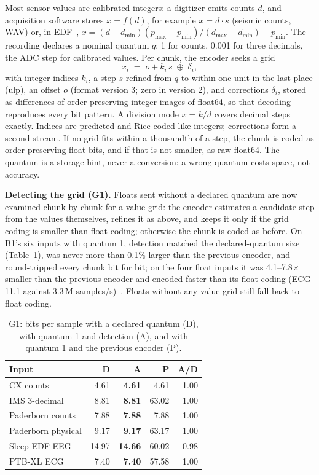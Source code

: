 \documentclass[sigconf,nonacm]{acmart}
\begin{document}
Most sensor values are calibrated integers: a digitizer emits counts $d$, and acquisition software stores $x=f(d)$, for example $x=d\cdot s$ (seismic counts, WAV) or, in EDF~\cite{edf}, $x=(d-d_{\min})(p_{\max}-p_{\min})/(d_{\max}-d_{\min})+p_{\min}$. The recording declares a nominal quantum $q$: 1 for counts, 0.001 for three decimals, the ADC step for calibrated values. Per chunk, the encoder seeks a grid
\begin{equation}
x_i \;=\; o + k_i\,s \;\oplus\; \delta_i,
\end{equation}
with integer indices $k_i$, a step $s$ refined from $q$ to within one unit in the last place (ulp), an offset $o$ (format version 3; zero in version 2), and corrections $\delta_i$, stored as differences of order-preserving integer images of float64, so that decoding reproduces every bit pattern. A division mode $x=k/d$ covers decimal steps exactly. Indices are predicted and Rice-coded like integers; corrections form a second stream. If no grid fits within a thousandth of a step, the chunk is coded as order-preserving float bits, and if that is not smaller, as raw float64. The quantum is a storage hint, never a conversion: a wrong quantum costs space, not accuracy.

\textbf{Detecting the grid (G1).} Floats sent without a declared quantum are now examined chunk by chunk for a value grid: the encoder estimates a candidate step from the values themselves, refines it as above, and keeps it only if the grid coding is smaller than float coding; otherwise the chunk is coded as before. On B1's six inputs with quantum 1, detection matched the declared-quantum size (Table~\ref{tab:g1}), was never more than 0.1\% larger than the previous encoder, and round-tripped every chunk bit for bit; on the four float inputs it was 4.1--7.8$\times$ smaller than the previous encoder and encoded faster than its float coding (ECG 11.1 against 3.3\,M samples/s)~\cite{g1}. Floats without any value grid still fall back to float coding.

\begin{table}[t]
\caption{G1: bits per sample with a declared quantum (D), with quantum 1 and detection (A), and with quantum 1 and the previous encoder (P).}
\label{tab:g1}
\small
\begin{tabular}{@{}lrrrr@{}}
\toprule
Input & D & \textbf{A} & P & A/D \\
\midrule
CX counts & 4.61 & \textbf{4.61} & 4.61 & 1.00 \\
IMS 3-decimal & 8.81 & \textbf{8.81} & 63.02 & 1.00 \\
Paderborn counts & 7.88 & \textbf{7.88} & 7.88 & 1.00 \\
Paderborn physical & 9.17 & \textbf{9.17} & 63.17 & 1.00 \\
Sleep-EDF EEG & 14.97 & \textbf{14.66} & 60.02 & 0.98 \\
PTB-XL ECG & 7.40 & \textbf{7.40} & 57.58 & 1.00 \\
\bottomrule
\end{tabular}
\end{table}
\end{document}

